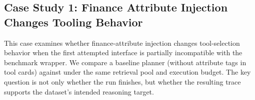\subsection{Case Study 1: Finance Attribute Injection Changes Tooling Behavior}
\label{sec:case_study_financebench_margin}

This case examines whether finance-attribute injection changes tool-selection behavior
when the first attempted interface is partially incompatible with the benchmark wrapper.
We compare a baseline planner (without attribute tags in tool cards) against \methodname{}
under the same retrieval pool and execution budget. The key question is not only whether
the run finishes, but whether the resulting trace supports the dataset's intended reasoning target.

